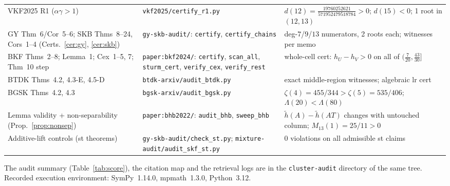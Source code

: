 \documentclass[10pt]{article}
\theoremstyle{plain}
\theoremstyle{definition}
\theoremstyle{remark}
\begin{document}
\begin{table}[h]
\begin{tabular}{@{}>{\raggedright\arraybackslash}p{5.6cm} >{\raggedright\arraybackslash}p{5.2cm} >{\raggedright\arraybackslash}p{4.4cm}@{}}
VKF2025 R1 ($\alpha\gamma>1$) & \texttt{vkf2025/certify\_r1.py} & $d(12)=\tfrac{19760252621}{571952479518784}>0$; $d(15)<0$; 1 root in $(12,13)$ \\
GY Thm~6/Cor~5--6; SKB Thms~8--24, Cors~1--4 (Certs.~\ref{cer:gy}, \ref{cer:skb}) & \texttt{gy-skb-audit/}: \texttt{certify}, \texttt{certify\_chains} & deg-$7$/$9$/$13$ numerators, 2 roots each; witnesses per memo \\
BKF Thms~2--8; Lemma~1; Cex~1--5, 7; Thm~10 step & \texttt{paper:bkf2024/}: \texttt{certify}, \texttt{scan\_all}, \texttt{sturm\_cert}, \texttt{verify\_cex}, \texttt{verify\_rest} & whole-cell cert: $h_U-h_V>0$ on all of $(\tfrac7{20},\tfrac{43}{30}]$ \\
BTDK Thms~4.2, 4.3-E, 4.5-D & \texttt{btdk-arxiv/audit\_btdk.py} & exact middle-region witnesses; algebraic lr cert \\
BGSK Thms~4.2, 4.3 & \texttt{bgsk-arxiv/audit\_bgsk.py} & $\zeta(4)=455/344>\zeta(5)=535/406$; $\Lambda(20)<\Lambda(80)$ \\
Lemma validity + non-separability (Prop.~\ref{prop:nonsep}) & \texttt{paper:bhb2022/}: \texttt{audit\_bhb}, \texttt{sweep\_bhb} & $\tilde h(A)-\tilde h(AT)$ changes with untouched column; $M_{13}(1)=25/11>0$ \\
Additive-lift controls (st theorems) & \texttt{gy-skb-audit/check\_st.py}; \texttt{mixture-audit/audit\_skf\_st.py} & $0$ violations on all admissible st claims \\
\bottomrule
\end{tabular}
\end{table}

The audit summary (Table~\ref{tab:score}), the citation map and the retrieval logs are in the \texttt{cluster-audit} directory of the same tree. Recorded execution environment: SymPy~1.14.0, mpmath~1.3.0, Python~3.12.

\setlength{\bibsep}{1pt plus 0.3ex}
{\small
{}


}
\end{document}
